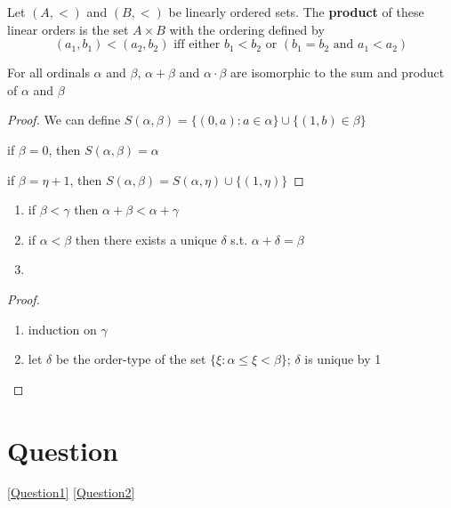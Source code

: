\documentclass[11pt]{article}
\begin{document}
\begin{definition}[]
Let \((A,<)\) and \((B,<)\) be linearly ordered sets. The \textbf{product} of these linear orders is the
set \(A\times B\) with the ordering defined by
\begin{equation*}
(a_1,b_1)<(a_2,b_2)\text{ iff either }b_1<b_2\text{ or }(b_1=b_2\text{ and }a_1<a_2)
\end{equation*}
\end{definition}

\begin{lemma}[]
\label{Question2}
For all ordinals \(\alpha\) and \(\beta\), \(\alpha+\beta\) and \(\alpha\cdot\beta\) are isomorphic to the sum and product of \(\alpha\) and \(\beta\)
\end{lemma}

\begin{proof}
We can define \(S(\alpha,\beta)=\{(0,a):a\in\alpha\}\cup\{(1,b)\in\beta\}\)

if \(\beta=0\), then \(S(\alpha,\beta)=\alpha\)

if \(\beta=\eta+1\), then \(S(\alpha,\beta)=S(\alpha,\eta)\cup\{(1,\eta)\}\)
\end{proof}

\begin{lemma}[]
\begin{enumerate}
\item if \(\beta<\gamma\) then \(\alpha+\beta<\alpha+\gamma\)
\item if \(\alpha<\beta\) then there exists a unique \(\delta\) s.t. \(\alpha+\delta=\beta\)
\item 
\end{enumerate}
\end{lemma}

\begin{proof}
\begin{enumerate}
\item induction on \(\gamma\)
\item let \(\delta\) be the order-type of the set \(\{\xi:\alpha\le\xi<\beta\}\); \(\delta\) is unique by 1
\end{enumerate}
\end{proof}



\section{Question}
\label{sec:org472873f}
\ref{Question1}
\ref{Question2}
\end{document}
